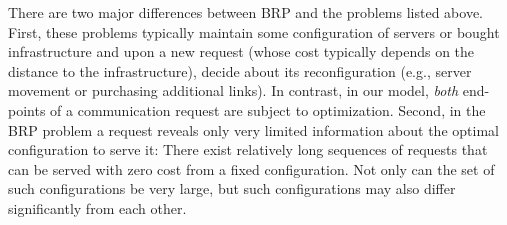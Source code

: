 There are two major differences between BRP and the problems listed above.
First, these problems typically maintain some configuration of servers or
bought infrastructure and upon a new request (whose cost typically depends on
the distance to the infrastructure), decide about its reconfiguration (e.g.,
server movement or purchasing additional links). In contrast, in our model,
\emph{both} end-points of a communication request are subject to optimization.
Second, in the BRP problem a request reveals only very limited information
about the optimal configuration to serve it: There exist relatively long
sequences of requests that can be served with zero cost from a fixed
configuration. Not only can the set of such configurations be very large, but
such configurations may also differ significantly from each other.

